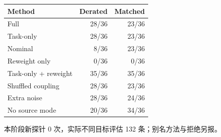 \begin{center}\small
\begin{tabular}{lrr}
\toprule
Method & Derated & Matched\\
\midrule
Full & 28/36 & 23/36\\
Task-only & 28/36 & 23/36\\
Nominal & 8/36 & 23/36\\
Reweight only & 0/36 & 0/36\\
Task-only + reweight & 35/36 & 35/36\\
Shuffled coupling & 28/36 & 23/36\\
Extra noise & 28/36 & 24/36\\
No source mode & 20/36 & 34/36\\
\bottomrule
\end{tabular}
\end{center}
本阶段新探针 0 次，实际不同目标评估 132 条；别名方法与拒绝另报。
